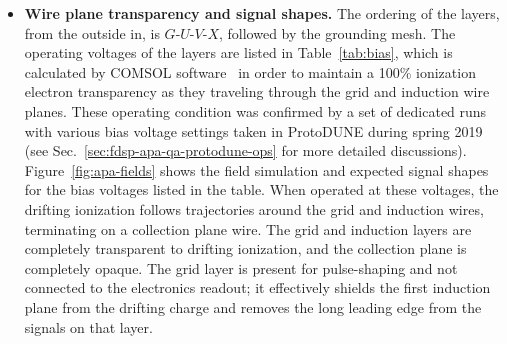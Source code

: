 \begin{itemize}
\begin{dunefigure}{fig:e-gamma}
{Summary of electron--photon separation performance studies from the   task force. (a) $e$--$\gamma$ separation by $dE/dx$ for the nominal wire spacing and angle (\SI{4.7}{mm}/$37.5^\circ$) compared to \SI{3}{mm} spacing or 45$^\circ$ induction wire angles. (b) Electron signal selection efficiency versus photon (background) rejection for the different detector configurations. The \SI{3}{mm} wire pitch and 45$^\circ$ wire angle have similar effects, so the 45$^\circ$ curve is partly obscured by the \SI{3}{mm} curve.}
(a)
\texttt{[image: sp-apa-e-gamma-dEdx.pdf]} \qquad
(b)
\texttt{[image: sp-apa-eff-bkgd-wires.pdf]} 
\end{dunefigure}

\item \textbf{Wire plane transparency and signal shapes.}  The ordering of the layers, from the outside in, is $G$-$U$-$V$-$X$, followed by the grounding mesh. The operating voltages of the  layers are listed in Table~\ref{tab:bias}, which is calculated by COMSOL software~\cite{COMSOL} 
in order to maintain a 
100\% ionization electron transparency as they traveling through the grid and induction wire planes.
These operating condition was confirmed by a set of dedicated runs with various bias voltage settings
taken in ProtoDUNE during spring 2019 (see Sec.~\ref{sec:fdsp-apa-qa-protodune-ops} for more detailed discussions). 
Figure~\ref{fig:apa-fields} shows the field simulation and expected signal shapes for the bias voltages listed in the table.  When operated at these voltages, the drifting ionization follows trajectories around the grid and induction wires, terminating on a collection plane wire. The grid and induction layers are completely transparent to drifting ionization, and the collection plane is completely opaque.  The grid layer is present for pulse-shaping and not connected to the electronics readout; it effectively shields the first induction plane from the drifting charge and removes the long leading edge from the signals on that layer. 



\end{itemize}
